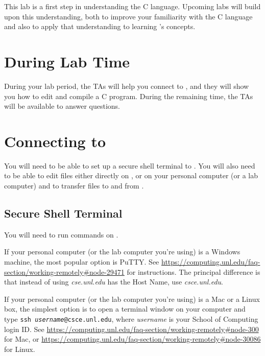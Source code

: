 This lab is a first step in understanding the C language. Upcoming labs will
build upon this understanding, both to improve your familiarity with the C
language and also to apply that understanding to learning \coursenumber's
concepts.

\section*{During Lab Time}

During your lab period, the TAs will help you connect to \runtimeenvironment,
and they will show you how to edit and compile a C program. During the remaining
time, the TAs will be available to answer questions.

\section{Connecting to \runtimeenvironment}


You will need to be able to set up a secure shell terminal to
\runtimeenvironment. You will also need to be able to edit files either
directly on \runtimeenvironment, or on your personal computer (or a lab
computer) and to transfer files to and from \runtimeenvironment.

\subsection{Secure Shell Terminal}

You will need to run commands on \runtimeenvironment.

If your personal computer (or the lab computer you're using) is a Windows
machine, the most popular option is PuTTY. See
\url{https://computing.unl.edu/faq-section/working-remotely#node-29471} for
instructions. The principal difference is that instead of using
\textit{cse.unl.edu} has the Host Name, use \textit{csce.unl.edu}.

If your personal computer (or the lab computer you're using) is a Mac or a
Linux box, the simplest option is to open a terminal window on your computer
and type \texttt{ssh \textit{username}@csce.unl.edu}, where \textit{username}
is your School of Computing login ID. See
\url{https://computing.unl.edu/faq-section/working-remotely#node-300} for Mac,
or \url{https://computing.unl.edu/faq-section/working-remotely#node-30086} for
Linux.

